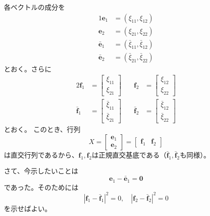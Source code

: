 \documentclass[a4j,disablejfam,dvipdfmx,papersize,slide,uplatex,21pt]{jsarticle}
\makeatletter
\renewenvironment{proof}[1][\proofname]{\par
        \pushQED{\qed}
        \normalfont
        \topsep6\p@\@plus6\p@ \trivlist
        \item[\hskip\labelsep{\bfseries #1}\@addpunct{\bfseries}]\ignorespaces
    }{%
        \popQED\endtrivlist\@endpefalse
    }
\renewcommand{\proofname}{証明.}
\makeatother
\begin{document}
\begin{proof}
    \newpage
    各ベクトルの成分を
    \begin{alignat}{1}
              \bm{e}_1 &= (\xi_{11}, \xi_{12}) \\
              \bm{e}_2 &= (\xi_{21}, \xi_{22}) \\
        \bar{\bm{e}}_1 &= (\bar{\xi}_{11}, \bar{\xi}_{12}) \\
        \bar{\bm{e}}_2 &= (\bar{\xi}_{21}, \bar{\xi}_{22})
    \end{alignat}
    とおく。さらに
    \begin{alignat}{2}
        \bm{f}_1 &= \left[
            \begin{array}{c}
                \xi_{11} \\
                \xi_{21}
            \end{array}
        \right] \quad
        &
        \bm{f}_2 &= \left[
            \begin{array}{c}
                \xi_{12} \\
                \xi_{22}
            \end{array}
        \right] \\
        \bar{\bm{f}}_1 &= \left[
            \begin{array}{c}
                \bar{\xi}_{11} \\
                \bar{\xi}_{21}
            \end{array}
        \right] \quad
        &
        \bar{\bm{f}}_2 &= \left[
            \begin{array}{c}
                \bar{\xi}_{12} \\
                \bar{\xi}_{22}
            \end{array}
        \right]
    \end{alignat}
    とおく。
    このとき、行列
    \begin{equation}
        X = \left[
            \begin{array}{c}
                \bm{e}_1 \\
                \bm{e}_2
            \end{array}
        \right]
        = [
            \begin{array}{cc}
                \bm{f}_1 & \bm{f}_2
            \end{array}]
    \end{equation}
    は直交行列であるから、$\bm{f}_1, \bm{f}_2$は正規直交基底である（$\bar{\bm{f}}_1, \bar{\bm{f}}_2$も同様）。

    \newpage
    さて、今示したいことは
    \begin{equation}
        \bm{e}_1 - \bar{\bm{e}}_1 = \bm{0}
    \end{equation}
    であった。そのためには
    \begin{equation}
        |\bm{f}_1 - \bar{\bm{f}}_1|^2 = 0, \quad
        |\bm{f}_2 - \bar{\bm{f}}_2|^2 = 0
    \end{equation}
    を示せばよい。


\end{proof}
\end{document}
